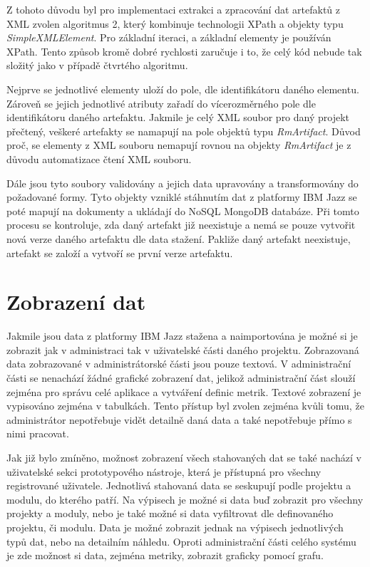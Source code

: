 \documentclass[czech,master]{diploma}
\begin{document}
Z tohoto důvodu byl pro implementaci extrakci a zpracování dat artefaktů z XML zvolen algoritmus 2, který kombinuje technologii XPath a objekty typu \textit{SimpleXMLElement}. Pro základní iteraci, a základní elementy je používán XPath. Tento způsob kromě dobré rychlosti zaručuje i to, že celý kód nebude tak složitý jako v případě čtvrtého algoritmu.

Nejprve se jednotlivé elementy uloží do pole, dle identifikátoru daného elementu. Zároveň se jejich jednotlivé atributy zařadí do vícerozměrného pole dle identifikátoru daného artefaktu. Jakmile je celý XML soubor pro daný projekt přečtený, veškeré artefakty se namapují na pole objektů typu \textit{RmArtifact}. Důvod proč, se elementy z XML souboru nemapují rovnou na objekty \textit{RmArtifact} je z důvodu automatizace čtení XML souboru.

Dále jsou tyto soubory validovány a jejich data upravovány a transformovány do požadované formy. Tyto objekty vzniklé stáhnutím dat z platformy IBM Jazz se poté mapují na dokumenty a ukládají do NoSQL MongoDB databáze. Při tomto procesu se kontroluje, zda daný artefakt již neexistuje a nemá se pouze vytvořit nová verze daného artefaktu dle data stažení. Pakliže daný artefakt neexistuje, artefakt se založí a vytvoří se první verze artefaktu.

\section{Zobrazení dat}
Jakmile jsou data z platformy IBM Jazz stažena a naimportována je možné si je zobrazit jak v administraci tak v uživatelské části daného projektu. Zobrazovaná data zobrazované v administrátorské části jsou pouze textová. V administrační části se nenachází žádné grafické zobrazení dat, jelikož administrační část slouží zejména pro správu celé aplikace a vytváření definic metrik. Textové zobrazení je vypisováno zejména v tabulkách. Tento přístup byl zvolen zejména kvůli tomu, že administrátor nepotřebuje vidět detailně daná data a také nepotřebuje přímo s nimi pracovat.

Jak již bylo zmíněno, možnost zobrazení všech stahovaných dat se také nachází v uživatelské sekci prototypového nástroje, která je přístupná pro všechny registrované uživatele. Jednotlivá stahovaná data se seskupují podle projektu a modulu, do kterého patří. Na výpisech je možné si data buď zobrazit pro všechny projekty a moduly, nebo je také možné si data vyfiltrovat dle definovaného projektu, či modulu. Data je možné zobrazit jednak na výpisech jednotlivých typů dat, nebo na detailním náhledu. Oproti administrační části celého systému je zde možnost si data, zejména metriky, zobrazit graficky pomocí grafu.
\end{document}
